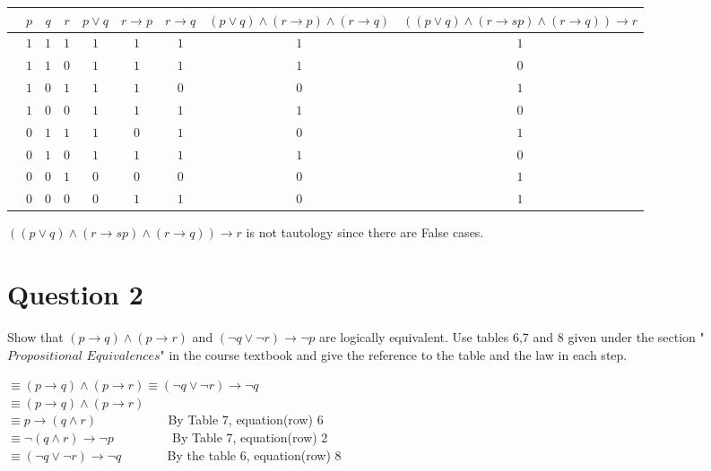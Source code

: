 \documentclass[a4paper,12pt]{article}
\newcommand\tab[1][1cm]{\hspace*{#1}}
\begin{document}
\begin{table}[H]
    \centering
    \begin{tabular}{|c||c|c|c|c|c|c|c|c|}
\hline
&$p$ &$q$ &$r$ &$p \vee q$ &$ r \rightarrow  p$&$ r \rightarrow  q$ &$(p \vee q) \wedge(r \rightarrow  p) \wedge(r \rightarrow  q) $  &$((p \vee q) \wedge(r \rightarrow s p) \wedge(r \rightarrow  q) )\rightarrow r$ \\ \hline
&$1$ &$1$ &$1$ &$1$  &$1$ &$1$  &$1$ &$1$\\ \hline
&$1$ &$1$ &$0$ &$1$  &$1$ &$1$  &$1$ &$0$\\ \hline
&$1$ &$0$ &$1$ &$1$  &$1$ &$0$  &$0$ &$1$\\ \hline
&$1$ &$0$ &$0$ &$1$  &$1$ &$1$  &$1$ &$0$\\ \hline
&$0$ &$1$ &$1$ &$1$  &$0$ &$1$  &$0$ &$1$\\ \hline
&$0$ &$1$ &$0$ &$1$  &$1$ &$1$  &$1$ &$0$\\ \hline
&$0$ &$0$ &$1$ &$0$  &$0$ &$0$  &$0$ &$1$\\ \hline
&$0$ &$0$ &$0$ &$0$  &$1$ &$1$  &$0$ &$1$\\ \hline
    \end{tabular}
    \begin{center}
    $((p \vee q) \wedge(r \rightarrow s p) \wedge(r \rightarrow  q) )\rightarrow r$  is not tautology since there are False cases.
\end{center}
    \label{tab:my_labelQ1_p2}
\end{table}






\newpage
\section*{Question 2 \hfill {}}
\tab Show that $(p \rightarrow q) \wedge (p \rightarrow r)$ and $(\neg q \vee \neg r)\rightarrow \neg p$ are logically equivalent. Use tables 6,7 and 8 given under the section "$\textit{Propositional Equivalences}$" in the course textbook and give the reference to the table and the law in each step.

\begin{tcolorbox}

$ \equiv (p\rightarrow q)\wedge(p\rightarrow r) \equiv (\neg q \vee \neg r)\rightarrow \neg q$ \,\,\,\,\,  \\
    $ \equiv (p\rightarrow q)\wedge(p\rightarrow r) $ \,\,\,\,\,\,\,\,         \\
    $ \equiv p \rightarrow (q \wedge r) $ \,\,\,\,\,\,\,\,\,\,\,\,\,\,\,\,\,\,\,\,\,\,\,\,\,\,\,\,\,\,\,\,By Table 7, equation(row) 6        \\
    $ \equiv \neg(q\wedge r)\rightarrow \neg p $ \,\,\,\,\,\,\,\,\,\,\,\,\,\,\,\,\,\,\,\,\,\,\,\,\,\,By Table 7, equation(row) 2  \\
    $ \equiv (\neg q \vee \neg r)\rightarrow \neg q $ \,\,\,\,\,\,\,\,\,\,\,\,\,\,\,\,\,\,\,\,By the table 6, equation(row) 8 \\




\end{tcolorbox}
\end{document}
